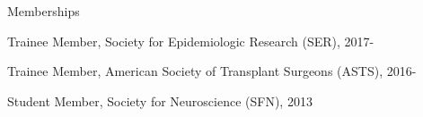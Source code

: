 \documentclass[10pt]{article}
\renewcommand{\section}[1]{\pagebreak[3]%
    \vspace{1.3\baselineskip}%
    \phantomsection\addcontentsline{toc}{section}{#1}%
    \noindent\llap{\scshape\smash{\parbox[t]{\marginparwidth}{\hyphenpenalty=10000\raggedright #1}}}%
    \vspace{-\baselineskip}\par}
\begin{document}
\vspace{2mm}

Memberships

\begin{innerlist}

\item Trainee Member, Society for Epidemiologic Research (SER), 2017-
\item Trainee Member, American Society of Transplant Surgeons (ASTS), 2016-
\item Student Member, Society for Neuroscience (SFN), 2013

\end{innerlist}

\end{document}
